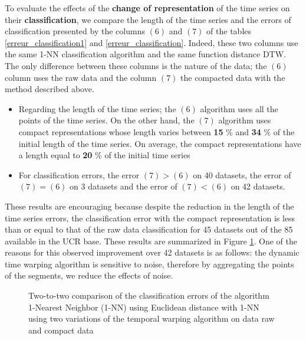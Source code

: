 To evaluate the effects of the \textbf{change of representation} of the time series on their
\textbf{classification}, we compare the length of the time series and the errors of
classification presented by the columns $ (6) $ and $ (7) $ of the tables \ref{erreur_classification1} and \ref{erreur_classification}.
Indeed, these two columns use the same 1-NN classification algorithm and the same function
distance DTW. The only difference between these columns is the nature of the data; the $ (6) $ column
uses the raw data and the column $ (7) $ the compacted data with the method described above.

\begin{itemize}
\item Regarding the length of the time series; the $ (6) $ algorithm uses all the points of
the time series. On the other hand, the $ (7) $ algorithm uses compact representations whose
length varies between \textbf{15} \% and \textbf{34} \% of the initial length of the time series.
On average, the compact representations have a length equal to \textbf {20} \% of the initial time series
\item For classification errors, the error $ (7)> (6) $ on 40 datasets,
the error of $ (7) = (6) $ on 3 datasets and the error of $ (7) <(6) $ on 42 datasets.
\end {itemize}

 These results are encouraging because despite the reduction in the length of the time series
 errors, the classification error with the compact representation is less than or equal to
that of the raw data classification for 45 datasets out of the 85 available in the
UCR base. These results are summarized in Figure \ref{synthesis}. One of the reasons for this observed improvement over 42 datasets is as follows: the dynamic time warping algorithm  is sensitive to noise, therefore by aggregating the points of the segments, we reduce the effects of noise.



\begin{figure}



\caption{Two-to-two comparison of the classification errors of the algorithm
1-Nearest Neighbor (1-NN) using Euclidean distance with 1-NN using two variations of the temporal warping algorithm on data
raw and compact data}

\label{synthesis}

\end{figure}




